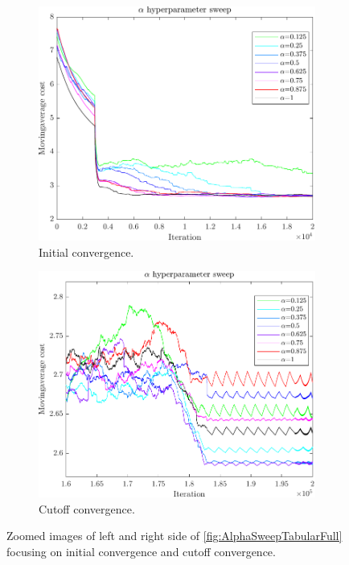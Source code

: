 \begin{figure}
	\centering
	\begin{subfigure}{.5\textwidth}
		\centering
		\includegraphics[width=1\linewidth]{figures/AlphaSweepTabRealHLeft.pdf}
		\caption{Initial convergence.}
		\label{fig:AlphaSweepTabularLeft}
	\end{subfigure}%
	\begin{subfigure}{.5\textwidth}
		\centering
		\includegraphics[width=1\linewidth]{figures/AlphaSweepTabRealHRight.pdf}
		\caption{Cutoff convergence.}
		\label{fig:AlphaSweepTabularRight}
	\end{subfigure}
	\caption{Zoomed images of left and right side of \cref{fig:AlphaSweepTabularFull} focusing on initial convergence and cutoff convergence.}
	\label{fig:Leftandright}
\end{figure}

